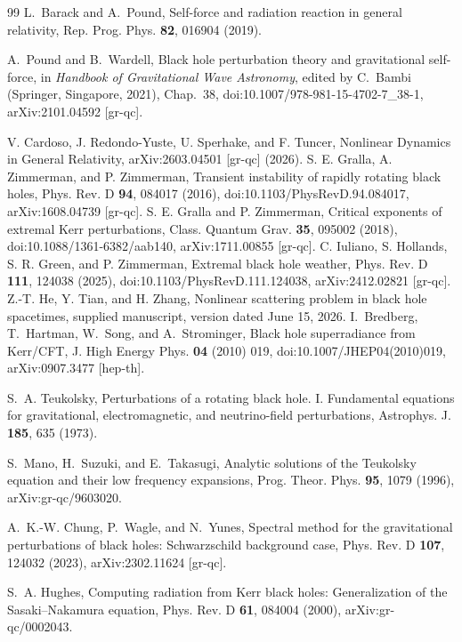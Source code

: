 \documentclass[aps,prd,twocolumn,10pt,nofootinbib,superscriptaddress,floatfix]{revtex4-2}
\begin{document}
\begin{thebibliography}{99}
L.~Barack and A.~Pound,
Self-force and radiation reaction in general relativity,
Rep. Prog. Phys. \textbf{82}, 016904 (2019).

A.~Pound and B.~Wardell,
Black hole perturbation theory and gravitational self-force,
in \textit{Handbook of Gravitational Wave Astronomy}, edited by
C.~Bambi (Springer, Singapore, 2021), Chap.~38,
doi:10.1007/978-981-15-4702-7\_38-1,
arXiv:2101.04592 [gr-qc].

V. Cardoso, J. Redondo-Yuste, U. Sperhake, and F. Tuncer,
Nonlinear Dynamics in General Relativity,
arXiv:2603.04501 [gr-qc] (2026).
S. E. Gralla, A. Zimmerman, and P. Zimmerman,
Transient instability of rapidly rotating black holes,
Phys. Rev. D \textbf{94}, 084017 (2016),
doi:10.1103/PhysRevD.94.084017, arXiv:1608.04739 [gr-qc].
S. E. Gralla and P. Zimmerman,
Critical exponents of extremal Kerr perturbations,
Class. Quantum Grav. \textbf{35}, 095002 (2018),
doi:10.1088/1361-6382/aab140, arXiv:1711.00855 [gr-qc].
C. Iuliano, S. Hollands, S. R. Green, and P. Zimmerman,
Extremal black hole weather,
Phys. Rev. D \textbf{111}, 124038 (2025),
doi:10.1103/PhysRevD.111.124038, arXiv:2412.02821 [gr-qc].
Z.-T. He, Y. Tian, and H. Zhang,
Nonlinear scattering problem in black hole spacetimes,
supplied manuscript, version dated June 15, 2026.
I.~Bredberg, T.~Hartman, W.~Song, and A.~Strominger,
Black hole superradiance from Kerr/CFT,
J. High Energy Phys. \textbf{04} (2010) 019,
doi:10.1007/JHEP04(2010)019,
arXiv:0907.3477 [hep-th].

S.~A. Teukolsky,
Perturbations of a rotating black hole. I. Fundamental equations for
gravitational, electromagnetic, and neutrino-field perturbations,
Astrophys. J. \textbf{185}, 635 (1973).

S.~Mano, H.~Suzuki, and E.~Takasugi,
Analytic solutions of the Teukolsky equation and their low frequency
expansions,
Prog. Theor. Phys. \textbf{95}, 1079 (1996),
arXiv:gr-qc/9603020.

A.~K.-W. Chung, P.~Wagle, and N.~Yunes,
Spectral method for the gravitational perturbations of black holes:
Schwarzschild background case,
Phys. Rev. D \textbf{107}, 124032 (2023),
arXiv:2302.11624 [gr-qc].

S.~A. Hughes,
Computing radiation from Kerr black holes: Generalization of the
Sasaki--Nakamura equation,
Phys. Rev. D \textbf{61}, 084004 (2000),
arXiv:gr-qc/0002043.


\end{thebibliography}
\end{document}
